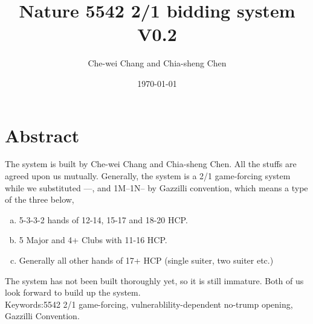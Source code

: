 \documentclass[12pt,twoside,a5paper]{report}%
\begin{document}
\title{Nature 5542 2/1 bidding system V0.2}
\author{Che-wei Chang and Chia-sheng Chen}
\date{\today}
\maketitle
\tableofcontents


\chapter*{Abstract}
	The system is built by Che-wei Chang and Chia-sheng Chen. All the stuffs are agreed upon us mutually. Generally, the system is a 2/1 game-forcing system while we substituted ----, and 1M--1N-- by Gazzilli convention, which means a type of the three below,
	\begin{enumerate}[(a)]
		\item 5-3-3-2 hands of 12-14, 15-17 and 18-20 HCP.
		\item 5 Major and 4+ Clubs with 11-16 HCP.
		\item Generally all other hands of 17+ HCP (single suiter, two suiter etc.)  
	\end{enumerate}
	The system has not been built thoroughly yet, so it is still immature. Both of us look forward to build up the system.\\
	Keywords:5542 2/1 game-forcing, vulnerablility-dependent no-trump opening, Gazzilli Convention.
\end{document}
